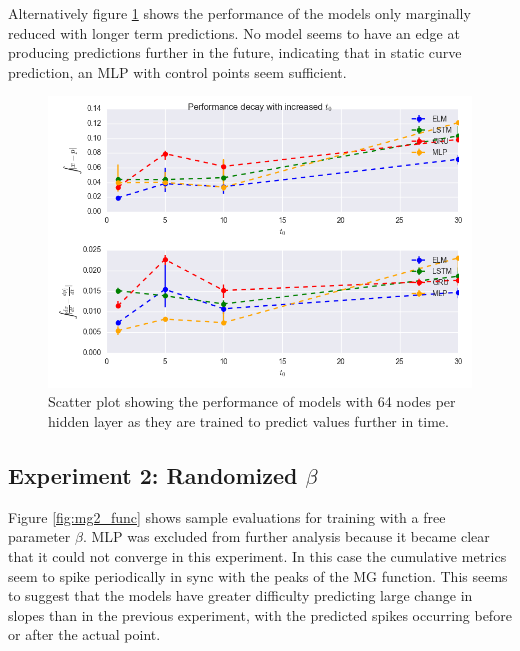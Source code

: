 \documentclass[11pt]{article}
\begin{document}
Alternatively figure \ref{fig:mg1_save} shows the performance of the models only
marginally reduced with longer term predictions. No model seems to
have an edge at producing predictions further in the future,
indicating that in static curve prediction, an MLP with control points
seem sufficient.

  \begin{figure}
    \begin{center}
   \includegraphics[width=.96\textwidth]{figures/mg1_save.png}
       
    \caption{Scatter plot showing the performance of models with 64 nodes
      per hidden layer as they are trained to predict values further
      in time.}
    \label{fig:mg1_save}
    \end{center}
  \end{figure}


 \subsection {Experiment 2: Randomized $\beta$}
Figure \ref{fig:mg2_func} shows sample evaluations for training with a
free parameter $\beta$. MLP was excluded from further analysis because
it became clear that it could not converge in this experiment. In this
case the cumulative metrics seem to spike periodically in sync
with the peaks of the MG function. This seems to suggest that the
models have greater difficulty predicting large change in slopes than
in the previous experiment, with the predicted spikes occurring before
or after the actual point.
\end{document}
